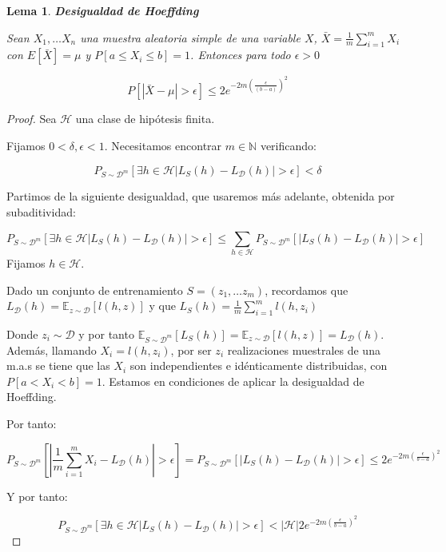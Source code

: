 \documentclass[11pt]{article}
\newtheorem{lemma}{Lema}
\begin{document}
\begin{lemma}
\textbf{Desigualdad de Hoeffding}

Sean $X_1, \ldots X_n$ una muestra aleatoria simple de una variable $X$, $\bar{X} = \frac{1}{m} \sum_{i=1}^m X_i$ con $E[\bar{X}] = \mu$ y $P[a \le X_i \le b] = 1$. Entonces para todo $\epsilon > 0$

\[P\left[\left| \bar{X} - \mu \right| > \epsilon \right] \le 2e^{-2m \left(\frac{\epsilon}{(b-a)}\right)^2} \]
\end{lemma}

\begin{proof}
Sea $\mathcal{H}$ una clase de hipótesis finita.

Fijamos $0 < \delta, \epsilon < 1$. Necesitamos encontrar $m\in \mathbb{N}$ verificando:

\[P_{S\sim \mathcal{D}^m} [\exists h\in \mathcal{H} |L_S(h) - L_{\mathcal{D}}(h)| > \epsilon] < \delta\]

Partimos de la siguiente desigualdad, que usaremos más adelante, obtenida por subaditividad:

\[P_{S\sim \mathcal{D}^m} [\exists h\in \mathcal{H} |L_S(h) - L_{\mathcal{D}}(h)| > \epsilon] \le \sum_{h \in \mathcal{H}} P_{S\sim \mathcal{D}^m} [|L_S(h) - L_{\mathcal{D}}(h)| > \epsilon]\]
Fijamos $h \in \mathcal{H}$.

Dado un conjunto de entrenamiento $S = (z_1, \ldots z_m)$, recordamos que $L_{\mathcal{D}} (h) = \mathbb{E}_{z\sim \mathcal{D}} [l(h,z)]$ y que $L_S(h) = \frac{1}{m} \sum_{i=1}^m l(h,z_i)$

Donde $z_i \sim \mathcal{D}$ y por tanto $\mathbb{E}_{S \sim \mathcal{D}^m} [L_S(h)] = \mathbb{E}_{z \sim \mathcal{D}} [l(h,z)] = L_{\mathcal{D}} (h)$. Además, llamando $X_i = l(h,z_i)$, por ser $z_i$ realizaciones muestrales de una m.a.s se tiene que las $X_i$ son independientes e idénticamente distribuidas, con $P[a < X_i < b] = 1$. Estamos en condiciones de aplicar la desigualdad de Hoeffding.

Por tanto:

\[P_{S \sim \mathcal{D}^m} \left[\left| \frac{1}{m} \sum_{i=1}^m X_i - L_{\mathcal{D}} (h) \right| > \epsilon\right] = P_{S\sim \mathcal{D}^m} [|L_S(h) - L_{\mathcal{D}}(h)| > \epsilon] \le 2e^{-2m \left( \frac{\epsilon}{b-a} \right)^2}\]

Y por tanto:

\[P_{S\sim \mathcal{D}^m} [\exists h\in \mathcal{H} |L_S(h) - L_{\mathcal{D}}(h)| > \epsilon] < |\mathcal{H}| 2e^{-2m \left( \frac{\epsilon}{b-a} \right)^2}\]
\end{proof}
\end{document}
